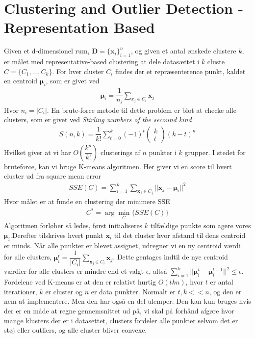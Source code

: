 \documentclass[paper=a4, fontsize=11pt]{scrartcl} %
\numberwithin{equation}{section} %
\numberwithin{figure}{section} %
\numberwithin{table}{section} %
\begin{document}
	\newpage
	
	\section*{Clustering and Outlier Detection - Representation Based}
	
	Given et d-dimensionel rum, $\mathbf{D}=\{\mathbf{x}_i\}^n_{i=1}$, og given et antal ønskede clustere $k$, er målet med representative-based clustering at dele datasættet i $k$ cluste $C=\{C_1,...,C_k\}$. For hver cluster $C_i$ findes der et repræsenterence punkt, kaldet en centroid $\mathbf{\mu}_i$, som er givet ved
	\begin{align*}
	\mathbf{\mu}_i=\dfrac{1}{n_i}\sum_{x_j\in C_i}\mathbf{x}_j
	\end{align*}
	Hvor $n_i=|C_i|$. En brute-force metode til dette problem er blot at checke alle clusters, som er givet ved \textit{Stirling numbers of the secound kind}
	\begin{align*}
	S(n,k)=\dfrac{1}{k!}\sum_{t=0}^{k}(-1)^t\left(\begin{matrix}k \\ t\end{matrix}\right)(k-t)^n
	\end{align*}
	Hvilket giver at vi har $O(\dfrac{k^n}{k!})$ clusterings af $n$ punkter i $k$ grupper. I stedet for bruteforce, kan vi bruge K-means algoritmen. Her giver vi en score til hvert cluster ud fra square mean error 
	\begin{align*}
		SSE(C)=\sum_{i=1}^{k}\sum_{\mathbf{x}_j\in C_j}||\mathbf{x}_j-\mathbf{\mu}_i||^2
	\end{align*}
	Hvor målet er at funde en clustering der minimere SSE
	\begin{align*}
	C^*=\arg\underset{C}{\min}\{SSE(C)\}
	\end{align*}
	Algoritmen forløber så ledes, først initialiseres $k$ tilfældige punkte som agere vores $\mathbf{\mu}_i$.Derefter tilskrives hvert punkt $\mathbf{x}_i$ til det cluster hvor afstand til dens centroid er minds. Når alle punkter er blevet assignet, udregner vi en ny centroid værdi for alle clusters, $\mathbf{\mu}_i^t=\dfrac{1}{|C_i|}\sum_{\mathbf{x}_j\in C_i}\mathbf{x}_j$. Dette gentages indtil de nye centroid værdier for alle clusters er mindre end et valgt $\epsilon$, altså $\sum_{i=1}^{k}||\mathbf{\mu}_i^t-\mathbf{\mu}^{t-1}_i||^2\leq\epsilon$. Fordelene ved K-means er at den er relativt hurtig $O(tkn)$, hvor $t$ er antal iterationer, $k$ er cluster og $n$ er data punkter. Normalt er $t,k<<n$, og den er nem at implementere. Men den har også en del ulemper. Den kan kun bruges hvis der er en måde at regne gennemsnittet ud på, vi skal på forhånd afgøre hvor mange klusters der er i datasettet, clusters fordeler alle punkter selvom det er støj eller outliers, og alle cluster bliver convexe. \\
	
\end{document}
